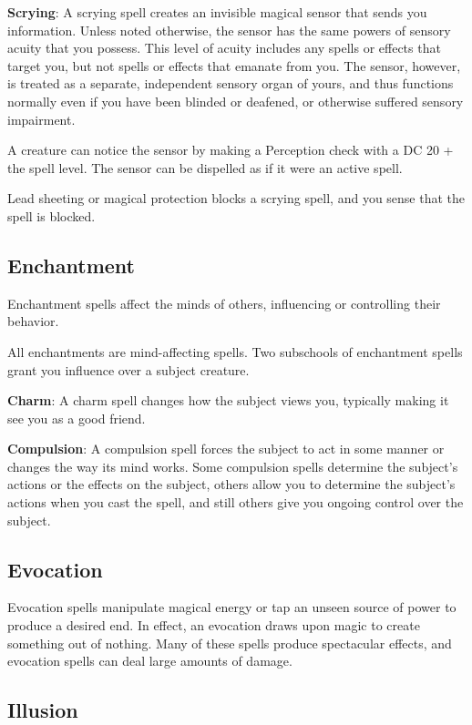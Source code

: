 \textbf{Scrying}: A scrying spell creates an invisible magical sensor that sends you information. Unless noted otherwise, the sensor has the same powers of sensory acuity that you possess. This level of acuity includes any spells or effects that target you, but not spells or effects that emanate from you. The sensor, however, is treated as a separate, independent sensory organ of yours, and thus functions normally even if you have been blinded or deafened, or otherwise suffered sensory impairment.
				
A creature can notice the sensor by making a Perception check with a DC 20 + the spell level. The sensor can be dispelled as if it were an active spell.
				
Lead sheeting or magical protection blocks a scrying spell, and you sense that the spell is blocked.
				
\subsection{Enchantment}

				
Enchantment spells affect the minds of others, influencing or controlling their behavior.
				
All enchantments are mind-affecting spells. Two subschools of enchantment spells grant you influence over a subject creature.
				
\textbf{Charm}: A charm spell changes how the subject views you, typically making it see you as a good friend.
				
\textbf{Compulsion}: A compulsion spell forces the subject to act in some manner or changes the way its mind works. Some compulsion spells determine the subject's actions or the effects on the subject, others allow you to determine the subject's actions when you cast the spell, and still others give you ongoing control over the subject.
				
\subsection{Evocation}

				
Evocation spells manipulate magical energy or tap an unseen source of power to produce a desired end. In effect, an evocation draws upon magic to create something out of nothing. Many of these spells produce spectacular effects, and evocation spells can deal large amounts of damage.
				
\subsection{Illusion}

